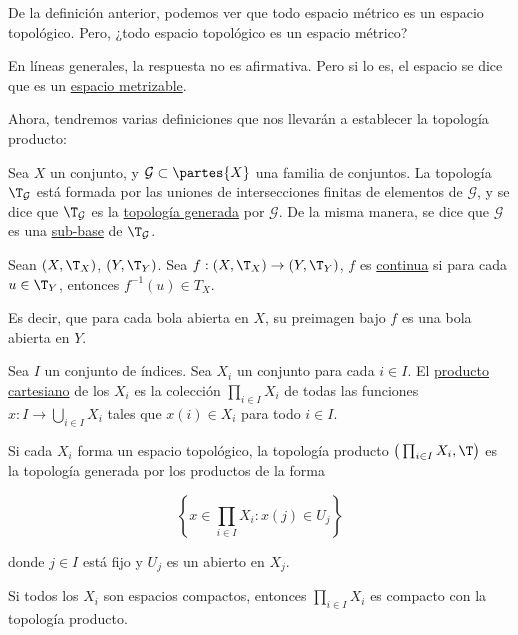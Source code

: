 \begin{pre}
    De la definición anterior, podemos ver que todo espacio métrico es un espacio topológico. Pero, ¿todo espacio topológico es un espacio métrico?
\end{pre}

\begin{defn}
    En líneas generales, la respuesta no es afirmativa. Pero si lo es, el espacio se dice que es un \ul{espacio metrizable}.
\end{defn}

Ahora, tendremos varias definiciones que nos llevarán a establecer la topología producto:

\begin{defn}
    Sea $X$ un conjunto, y $\mathcal{G} \subset \partes{X}$ una familia de conjuntos. La topología $\T_{\mathcal{G}}$ está formada por las uniones de intersecciones finitas de elementos de $\mathcal{G}$, y se dice que $\T_{\mathcal{G}}$ es la \ul{topología generada} por $\mathcal{G}$. De la misma manera, se dice que $\mathcal{G}$ es una \ul{sub-base} de $\T_{\mathcal{G}}$.
\end{defn}

\begin{defn}
    Sean $(X, \T_X)$, $(Y, \T_Y)$. Sea $f: (X, \T_X) \rightarrow (Y, \T_Y)$, $f$ es \ul{continua} si para cada $u \in \T_Y$, entonces $f^{-1}(u) \in T_X$.
    
    Es decir, que para cada bola abierta en $X$, su preimagen bajo $f$ es una bola abierta en $Y$.
\end{defn}

\begin{defn}
    Sea $I$ un conjunto de índices. Sea $X_i$ un conjunto para cada $i \in I$. El \ul{producto cartesiano} de los $X_i$ es la colección $\prod_{i \in I} X_i$ de todas las funciones $x: I \rightarrow \bigcup_{i \in I} X_i$ tales que $x(i) \in X_i$ para todo $i \in I$.
    
    Si cada $X_i$ forma un espacio topológico, la topología producto $\big(\prod_{i \in I} X_i, \T \big)$ es la topología generada por los productos de la forma
    
    \[
    \left\{ x \in \prod_{i \in I} X_i : x(j) \in U_j \right\}
    \]
    
    \noindent donde $j \in I$ está fijo y $U_j$ es un abierto en $X_j$.
\end{defn}

\begin{teo}[Tychonov]\label{teo:TT}
    Si todos los $X_i$ son espacios compactos, entonces $\prod_{i \in I} X_i$ es compacto con la topología producto.
\end{teo}